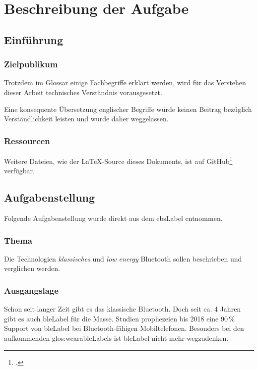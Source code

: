 \chapter{Beschreibung der Aufgabe}

\section{Einführung}
\subsection{Zielpublikum}
Trotzdem im Glossar einige Fachbegriffe erklärt werden, wird für das Verstehen dieser Arbeit technisches Verständnis vorausgesetzt.

Eine konsequente Übersetzung englischer Begriffe würde keinen Beitrag bezüglich Verständlichkeit leisten und wurde daher weggelassen.

\subsection{Ressourcen}
Weitere Dateien, wie der \LaTeX-Source dieses Dokuments, ist auf GitHub\footcite{GitHub_ble-seminar_2015-04-17} verfügbar.

\section{Aufgabenstellung}
Folgende Aufgabenstellung wurde direkt aus dem \gls{ebsLabel} entnommen.

\subsection{Thema}
Die Technologien \textit{klassisches} und \textit{low energy} Bluetooth sollen beschrieben und verglichen werden.

\subsection{Ausgangslage}
Schon seit langer Zeit gibt es das klassische Bluetooth. Doch seit ca. 4 Jahren gibt es auch \gls{bleLabel} für die Masse. Studien prophezeien bis 2018 eine 90\,\% Support von \gls{bleLabel} bei Bluetooth-fähigen Mobiltelefonen.
Besonders bei den aufkommenden \glspl{glos:wearableLabel} ist \gls{bleLabel} nicht mehr wegzudenken.

